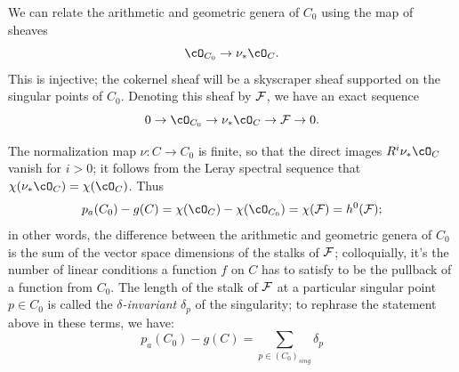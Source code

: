 We can relate the arithmetic and geometric genera of $C_0$ using the map of sheaves
$$
\cO_{C_0} \to \nu_*\cO_C.
$$
This is injective; the cokernel sheaf will be a skyscraper sheaf supported on the singular points of $C_0$. Denoting this sheaf by $\cF$, we have an exact sequence
$$
0 \to \cO_{C_0} \to \nu_*\cO_C \to \cF \to 0.
$$


The normalization map $\nu: C \to C_0$ is finite, so that the direct images $R^i\nu_*\cO_C$ vanish for $i > 0$; it follows from the Leray spectral sequence that $\chi(\nu_*\cO_C) = \chi(\cO_C)$. Thus
$$
p_a(C_0) - g(C) =  \chi(\cO_{C}) -   \chi(\cO_{C_0}) = \chi(\cF) = h^0(\cF);
$$ 
in other words, the difference between the arithmetic and geometric genera of $C_0$ is the sum of the vector space dimensions of the stalks of $\cF$; colloquially, it's the number of linear conditions a function $f$ on $C$ has to satisfy to be the pullback of a function from $C_0$. The length of the stalk of $\cF$ at a particular singular point $p \in C_0$ is called the \emph{$\delta$-invariant} $\delta_p$ of the singularity; to rephrase the statement above in these terms, we have:
$$
p_a(C_0) - g(C) = \sum_{p \in (C_0)_{sing}} \delta_p
$$ 

